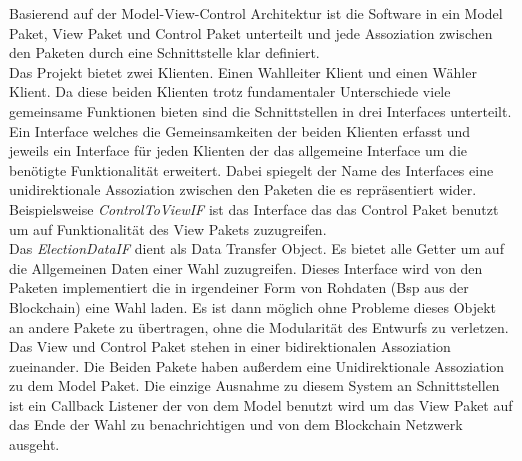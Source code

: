\documentclass[parskip=full]{scrartcl}
\begin{document}
	Basierend auf der Model-View-Control Architektur ist die Software in ein Model Paket, View Paket und Control Paket unterteilt und jede Assoziation zwischen den Paketen durch eine Schnittstelle klar definiert. 
	\\
	Das Projekt bietet zwei Klienten. Einen Wahlleiter Klient und einen Wähler Klient. Da diese beiden Klienten trotz fundamentaler Unterschiede viele gemeinsame Funktionen bieten sind die Schnittstellen in drei Interfaces unterteilt. Ein Interface welches die Gemeinsamkeiten der beiden Klienten erfasst und jeweils ein Interface für jeden Klienten der das allgemeine Interface um die benötigte Funktionalität erweitert. Dabei spiegelt der Name des Interfaces eine unidirektionale Assoziation zwischen den Paketen die es repräsentiert wider. Beispielsweise \textit{ControlToViewIF} ist das Interface das das Control Paket benutzt um auf Funktionalität des View Pakets zuzugreifen.
	\\
	Das \textit{ElectionDataIF} dient als Data Transfer Object. Es bietet alle Getter um auf die Allgemeinen Daten einer Wahl zuzugreifen. Dieses Interface wird von den Paketen implementiert die in irgendeiner Form von Rohdaten (Bsp aus der Blockchain) eine Wahl laden. Es ist dann möglich ohne Probleme dieses Objekt an andere Pakete zu übertragen, ohne die Modularität des Entwurfs zu verletzen.
	\\
	Das View und Control Paket stehen in einer bidirektionalen Assoziation zueinander. Die Beiden Pakete haben außerdem eine Unidirektionale Assoziation zu dem Model Paket. Die einzige Ausnahme zu diesem System an Schnittstellen ist ein Callback Listener der von dem Model benutzt wird um das View Paket auf das Ende der Wahl zu benachrichtigen und von dem Blockchain Netzwerk ausgeht.
	\\
\end{document}
